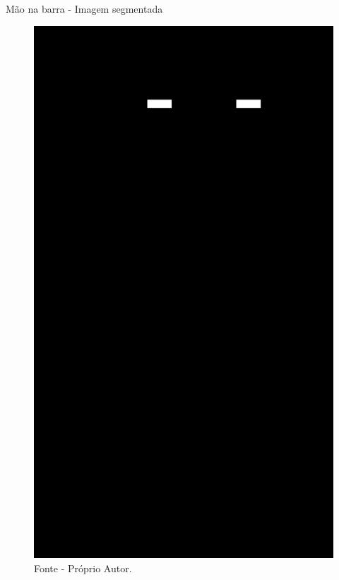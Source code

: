 \begin{frame}{Mão na barra - Imagem segmentada}
    \begin{figure}[!ht]
    \centering
    \includegraphics[scale=0.1]{img/desenvolvimento/maoBarra/only_hands.png}
    \caption*{Fonte - Próprio Autor.}
    \end{figure}
\end{frame}


